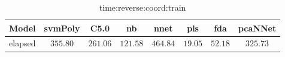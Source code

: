 \begin{table}[!ht]
	\centering
	\begin{tabular}{|c|c|c|c|c|c|c|c|}
		\hline
		Model & svmPoly & C5.0 & nb & nnet & pls & fda & pcaNNet \\ \hline
		elapsed & $355.80$ & $261.06$ & $121.58$ & $464.84$ & $19.05$ & $52.18$ & $325.73$ \\ \hline
	\end{tabular}
	\caption{time:reverse:coord:train}
	\label{tab:time:reverse:coord:train}
\end{table}
